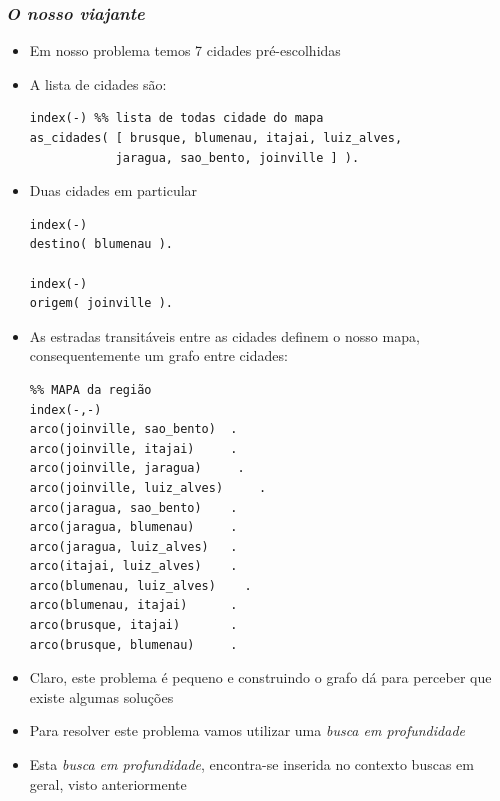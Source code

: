 \begin{frame}[fragile, allowframebreaks=0.9]
 \frametitle{\textit{O nosso viajante}}

\begin{itemize}
  \item Em nosso problema temos 7 cidades pré-escolhidas

  \item A lista de cidades são:
  \begin{verbatim}
index(-) %% lista de todas cidade do mapa
as_cidades( [ brusque, blumenau, itajai, luiz_alves,
            jaragua, sao_bento, joinville ] ).
\end{verbatim}

  \item  Duas cidades em particular
\begin{verbatim}
index(-)
destino( blumenau ).

index(-)
origem( joinville ).
\end{verbatim}  

  
\item As estradas transitáveis entre as cidades definem
  o nosso mapa, consequentemente um grafo entre
  cidades:
\begin{verbatim}
%% MAPA da região
index(-,-)
arco(joinville, sao_bento)  .
arco(joinville, itajai)     .
arco(joinville, jaragua)     .
arco(joinville, luiz_alves)     .
arco(jaragua, sao_bento)    .
arco(jaragua, blumenau)     .
arco(jaragua, luiz_alves)   .
arco(itajai, luiz_alves)    . 
arco(blumenau, luiz_alves)    . 
arco(blumenau, itajai)      .
arco(brusque, itajai)       .
arco(brusque, blumenau)     .
\end{verbatim} 
  
\item Claro, este problema é pequeno e construindo o grafo dá para perceber que existe
algumas soluções

  \item Para resolver este problema vamos utilizar uma \textit{busca em profundidade}
  
  \item Esta \textit{busca em profundidade}, encontra-se inserida no contexto buscas em geral,
  visto anteriormente
\end{itemize}


\end{frame}

